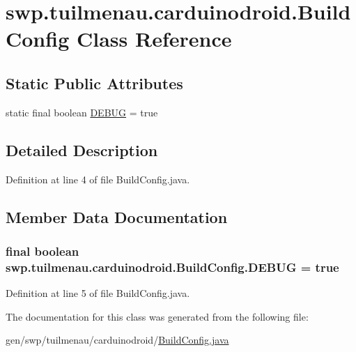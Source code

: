 \hypertarget{classswp_1_1tuilmenau_1_1carduinodroid_1_1_build_config}{}\section{swp.\+tuilmenau.\+carduinodroid.\+Build\+Config Class Reference}
\label{classswp_1_1tuilmenau_1_1carduinodroid_1_1_build_config}
\subsection*{Static Public Attributes}
\begin{DoxyCompactItemize}
\item 
static final boolean \hyperlink{classswp_1_1tuilmenau_1_1carduinodroid_1_1_build_config_a35cad79812d4ccefcee188865c7fe790}{D\+E\+B\+U\+G} = true
\end{DoxyCompactItemize}


\subsection{Detailed Description}


Definition at line 4 of file Build\+Config.\+java.



\subsection{Member Data Documentation}
\hypertarget{classswp_1_1tuilmenau_1_1carduinodroid_1_1_build_config_a35cad79812d4ccefcee188865c7fe790}{}
\subsubsection[{D\+E\+B\+U\+G}]{\setlength{\rightskip}{0pt plus 5cm}final boolean swp.\+tuilmenau.\+carduinodroid.\+Build\+Config.\+D\+E\+B\+U\+G = true\hspace{0.3cm}{\ttfamily [static]}}\label{classswp_1_1tuilmenau_1_1carduinodroid_1_1_build_config_a35cad79812d4ccefcee188865c7fe790}


Definition at line 5 of file Build\+Config.\+java.



The documentation for this class was generated from the following file\+:\begin{DoxyCompactItemize}
\item 
gen/swp/tuilmenau/carduinodroid/\hyperlink{_build_config_8java}{Build\+Config.\+java}\end{DoxyCompactItemize}
